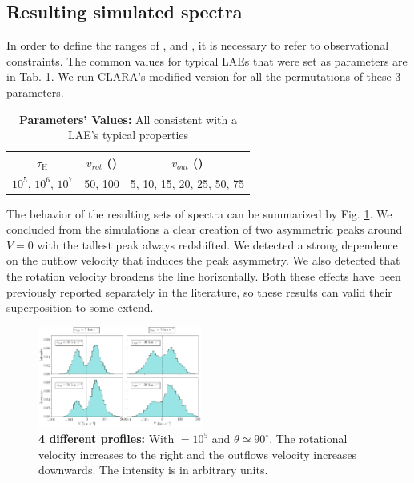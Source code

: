 \documentclass[twocolappendix]{latex/emulateapj}
\begin{document}
\subsection{Resulting simulated spectra}
In order to define the ranges of \tauh, \vrot and \vout, it is necessary to refer to observational constraints. The common values for typical LAEs that were set as parameters are in Tab. \ref{tab:values}. We run CLARA's modified version for all the permutations of these 3 parameters. \\

\begin{table}[htbp]
	\centering
	\begin{tabular}{|c|c|c|}
		\hline
		$\tau_{\mathrm{H}}$ & $v_{rot}$ (\kms) & $v_{out}$ (\kms) \\
		\hline
		$10^5$, $10^6$, $10^7$ & 50, 100 & 5, 10, 15, 20, 25, 50, 75 \\
		\hline
	\end{tabular}
	\caption{\textbf{Parameters' Values:} All consistent with a LAE's typical properties}
	\label{tab:values}
\end{table}

The behavior of the resulting sets of spectra can be summarized by Fig. \ref{fig:summary}. We concluded from the simulations a clear creation of two asymmetric peaks around $V=0$ \kms with the tallest peak always redshifted. We detected a strong dependence on the outflow velocity that induces the peak asymmetry. We also detected that the rotation velocity broadens the line horizontally. Both these effects have been previously reported separately in the literature, so these results can valid their superposition to some extend. \\

\begin{figure}[h!]
	\begin{center}
		\includegraphics[width=0.48\textwidth]{./figures/summary}
	\end{center}
	\caption{\textbf{4 different \lya profiles:} With \tauh$=10^5$ and $\theta \simeq 90^\circ$. The rotational velocity \vrot increases to the right and the outflows velocity \vout increases downwards. The intensity is in arbitrary units.
		\label{fig:summary}}
\end{figure}
\end{document}
